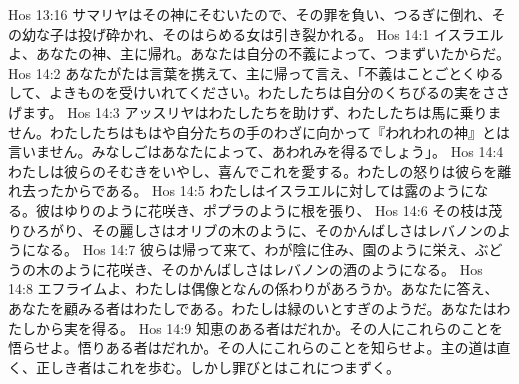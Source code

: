 Hos 13:16  サマリヤはその神にそむいたので、その罪を負い、つるぎに倒れ、その幼な子は投げ砕かれ、そのはらめる女は引き裂かれる。
Hos 14:1  イスラエルよ、あなたの神、主に帰れ。あなたは自分の不義によって、つまずいたからだ。
Hos 14:2  あなたがたは言葉を携えて、主に帰って言え、「不義はことごとくゆるして、よきものを受けいれてください。わたしたちは自分のくちびるの実をささげます。
Hos 14:3  アッスリヤはわたしたちを助けず、わたしたちは馬に乗りません。わたしたちはもはや自分たちの手のわざに向かって『われわれの神』とは言いません。みなしごはあなたによって、あわれみを得るでしょう」。
Hos 14:4  わたしは彼らのそむきをいやし、喜んでこれを愛する。わたしの怒りは彼らを離れ去ったからである。
Hos 14:5  わたしはイスラエルに対しては露のようになる。彼はゆりのように花咲き、ポプラのように根を張り、
Hos 14:6  その枝は茂りひろがり、その麗しさはオリブの木のように、そのかんばしさはレバノンのようになる。
Hos 14:7  彼らは帰って来て、わが陰に住み、園のように栄え、ぶどうの木のように花咲き、そのかんばしさはレバノンの酒のようになる。
Hos 14:8  エフライムよ、わたしは偶像となんの係わりがあろうか。あなたに答え、あなたを顧みる者はわたしである。わたしは緑のいとすぎのようだ。あなたはわたしから実を得る。
Hos 14:9  知恵のある者はだれか。その人にこれらのことを悟らせよ。悟りある者はだれか。その人にこれらのことを知らせよ。主の道は直く、正しき者はこれを歩む。しかし罪びとはこれにつまずく。


